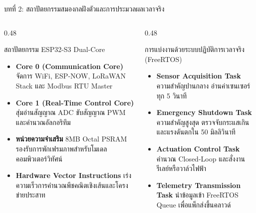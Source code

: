 \documentclass[aspectratio=169, 10pt]{beamer}
\begin{document}
\begin{frame}{บทที่ 2: สถาปัตยกรรมสมองกลฝังตัวและการประมวลผลเวลาจริง}
\begin{columns}[T]
    \begin{column}{0.48\textwidth}
        \begin{mastercard}{สถาปัตยกรรม ESP32-S3 Dual-Core}
            \begin{itemize}
                \item \textbf{Core 0 (Communication Core)} จัดการ WiFi, ESP-NOW, LoRaWAN Stack และ Modbus RTU Master
                \item \textbf{Core 1 (Real-Time Control Core)} สุ่มอ่านสัญญาณ ADC ขับสัญญาณ PWM และคำนวณอัลกอริทึม
                \item \textbf{หน่วยความจำเสริม} 8MB Octal PSRAM รองรับการพักเฟรมภาพสำหรับโมเดลคอมพิวเตอร์วิทัศน์
                \item \textbf{Hardware Vector Instructions} เร่งความเร็วการคำนวณพีชคณิตเชิงเส้นและโครงข่ายประสาท
            \end{itemize}
        \end{mastercard}
    \end{column}
    \begin{column}{0.48\textwidth}
        \begin{goldcard}{การแบ่งงานด้วยระบบปฏิบัติการเวลาจริง (FreeRTOS)}
            \begin{itemize}
                \item \textbf{Sensor Acquisition Task} ความสำคัญปานกลาง อ่านค่าเซนเซอร์ทุก 5 วินาที
                \item \textbf{Emergency Shutdown Task} ความสำคัญสูงสุด ตรวจจับกระแสเกินและแรงดันตกใน 50 มิลลิวินาที
                \item \textbf{Actuation Control Task} คำนวณ Closed-Loop และสั่งงานรีเลย์หรือวาล์วไฟฟ้า
                \item \textbf{Telemetry Transmission Task} นำข้อมูลเข้า FreeRTOS Queue เพื่อแพ็กส่งขึ้นคลาวด์
            \end{itemize}
        \end{goldcard}
    \end{column}
\end{columns}
\end{frame}
\end{document}
